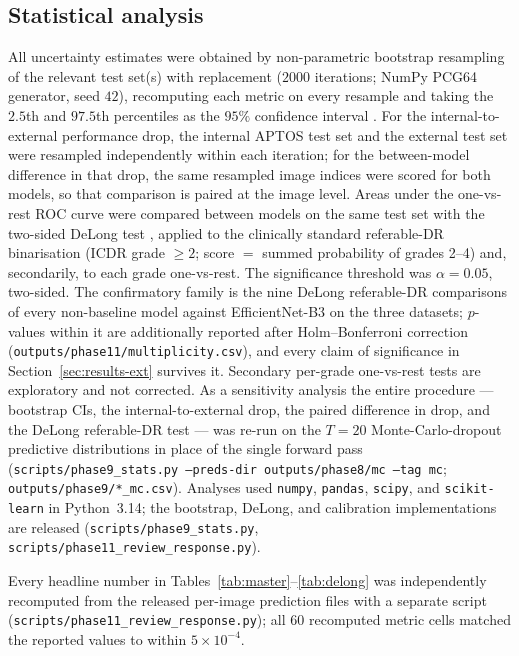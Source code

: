 \documentclass[journal]{IEEEtran}
\begin{document}
\subsection{Statistical analysis}
\label{sec:methods-stats}

All uncertainty estimates were obtained by non-parametric bootstrap resampling of
the relevant test set(s) with replacement ($2000$ iterations; NumPy PCG64
generator, seed $42$), recomputing each metric on every resample and taking the
$2.5$th and $97.5$th percentiles as the $95\%$ confidence interval
\cite{efron1994bootstrap}. For the internal-to-external performance drop, the
internal APTOS test set and the external test set were resampled independently
within each iteration; for the between-model difference in that drop, the same
resampled image indices were scored for both models, so that comparison is paired
at the image level. Areas under the one-vs-rest ROC curve were compared between
models on the same test set with the two-sided DeLong test
\cite{delong1988,sun2014fast}, applied to the clinically standard referable-DR
binarisation (ICDR grade $\geq 2$; score $=$ summed probability of grades 2--4)
and, secondarily, to each grade one-vs-rest. The significance threshold was
$\alpha=0.05$, two-sided. The confirmatory family is the nine DeLong referable-DR
comparisons of every non-baseline model against EfficientNet-B3 on the three
datasets; $p$-values within it are additionally reported after Holm--Bonferroni
correction (\texttt{outputs/phase11/multiplicity.csv}), and every claim of
significance in Section~\ref{sec:results-ext} survives it. Secondary per-grade
one-vs-rest tests are exploratory and not corrected. As a sensitivity analysis
the entire procedure --- bootstrap CIs, the internal-to-external drop, the paired
difference in drop, and the DeLong referable-DR test --- was re-run on the
$T=20$ Monte-Carlo-dropout predictive distributions in place of the single
forward pass (\texttt{scripts/phase9\_stats.py --preds-dir outputs/phase8/mc
--tag mc}; \texttt{outputs/phase9/*\_mc.csv}). Analyses used \texttt{numpy},
\texttt{pandas}, \texttt{scipy}, and \texttt{scikit-learn} in Python~3.14; the
bootstrap, DeLong, and calibration implementations are released
(\texttt{scripts/phase9\_stats.py}, \texttt{scripts/phase11\_review\_response.py}).

Every headline number in Tables~\ref{tab:master}--\ref{tab:delong} was
independently recomputed from the released per-image prediction files with a
separate script (\texttt{scripts/phase11\_review\_response.py}); all $60$
recomputed metric cells matched the reported values to within $5\times10^{-4}$.
\end{document}
